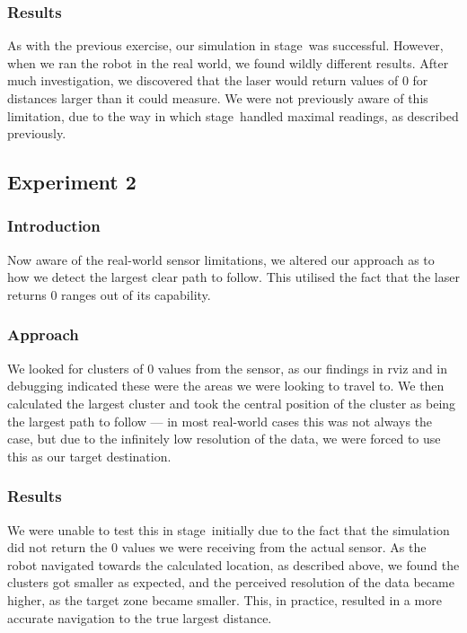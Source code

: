 \documentclass[twocolumn,11pt]{article}
\newcommand{\stage}{\textsf{stage}}
\begin{document}
\subsubsection{Results}

As with the previous exercise, our simulation in \stage\ was successful. However, when we ran the robot in the real world, we found wildly different results. After much investigation, we discovered that the laser would return values of $0$ for distances larger than it could measure. We were not previously aware of this limitation, due to the way in which \stage\ handled maximal readings, as described previously.

\subsection{Experiment 2}

\subsubsection{Introduction}

Now aware of the real-world sensor limitations, we altered our approach as to how we detect the largest clear path to follow. This utilised the fact that the laser returns $0$ ranges out of its capability.

\subsubsection{Approach}

We looked for clusters of $0$ values from the sensor, as our findings in \textsf{rviz} and in debugging indicated these were the areas we were looking to travel to. We then calculated the largest cluster and took the central position of the cluster as being the largest path to follow --- in most real-world cases this was not always the case, but due to the infinitely low resolution of the data, we were forced to use this as our target destination.

\subsubsection{Results}

We were unable to test this in \stage\ initially due to the fact that the simulation did not return the $0$ values we were receiving from the actual sensor. As the robot navigated towards the calculated location, as described above, we found the clusters got smaller as expected, and the perceived resolution of the data became higher, as the target zone became smaller. This, in practice, resulted in a more accurate navigation to the true largest distance.
\end{document}
